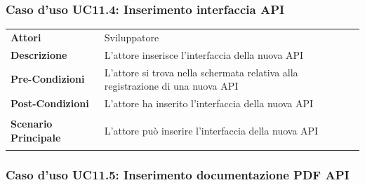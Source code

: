 \subsubsection{Caso d'uso UC11.4: Inserimento interfaccia API}
\label{UC11_4}

\begin{minipage}{\linewidth}
	\begin{tabular}{ l | p{11cm}}
		\hline
		\rowcolor{Gray}
		\multicolumn{2}{c}{UC11.4 - Inserimento interfaccia API} \\
		\hline
		\textbf{Attori} & Sviluppatore \\
		\textbf{Descrizione} & L'attore inserisce l'interfaccia della nuova API \\
		\textbf{Pre-Condizioni} & L'attore si trova nella schermata relativa alla registrazione di una nuova API \\
		\textbf{Post-Condizioni} & L'attore ha inserito l'interfaccia della nuova API \\
		\textbf{Scenario Principale} & 
		\begin{enumerate*}[label=(\arabic*.),itemjoin={\newline}]
			\item L'attore può inserire l'interfaccia della nuova API
		\end{enumerate*}\\
	\end{tabular}
\end{minipage}

\subsubsection{Caso d'uso UC11.5: Inserimento documentazione PDF API}
\label{UC11_5}

